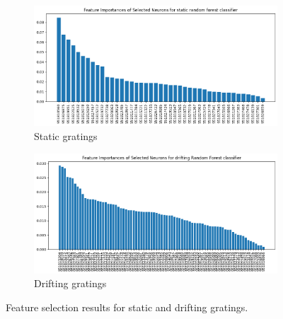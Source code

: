 \documentclass[10pt,twocolumn]{article}
\begin{document}
\begin{figure}[H]
  \centering
  \begin{subfigure}[b]{0.48\linewidth}
    \centering
    \includegraphics[width=\linewidth]{report_images/static_feature_selection.png}
    \caption{Static gratings}
    \label{fig:static_feature}
  \end{subfigure}
  \hfill
  \begin{subfigure}[b]{0.48\linewidth}
    \centering
    \includegraphics[width=\linewidth]{report_images/drifting_feature_selection.png}
    \caption{Drifting gratings}
    \label{fig:drifting_feature}
  \end{subfigure}
  \caption{Feature selection results for static and drifting gratings.}
  \label{fig:feature_selection_comparison}
\end{figure}
\end{document}
